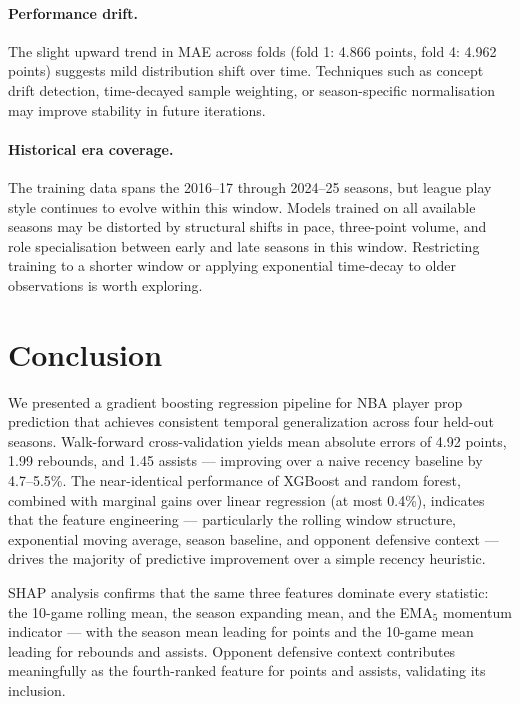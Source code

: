 \documentclass[12pt, letterpaper]{article}
\begin{document}
\paragraph{Performance drift.}
The slight upward trend in MAE across folds (fold 1: 4.866 points,
fold 4: 4.962 points) suggests mild distribution shift over time.
Techniques such as concept drift detection, time-decayed sample
weighting, or season-specific normalisation may improve stability
in future iterations.

\paragraph{Historical era coverage.}
The training data spans the 2016--17 through 2024--25 seasons, but league
play style continues to evolve within this window.
Models trained on all available seasons may be distorted by
structural shifts in pace, three-point volume, and role specialisation
between early and late seasons in this window.
Restricting training to a shorter window or applying
exponential time-decay to older observations is worth exploring.

\section{Conclusion}
\label{sec:conclusion}

We presented a gradient boosting regression pipeline for NBA player prop
prediction that achieves consistent temporal generalization across four
held-out seasons.
Walk-forward cross-validation yields mean absolute errors of 4.92 points,
1.99 rebounds, and 1.45 assists --- improving over a naive recency baseline
by 4.7--5.5\%.
The near-identical performance of XGBoost and random forest, combined with
marginal gains over linear regression (at most 0.4\%), indicates that the
feature engineering --- particularly the rolling window structure,
exponential moving average, season baseline, and opponent defensive
context --- drives the majority of predictive improvement over a simple
recency heuristic.

SHAP analysis confirms that the same three features dominate every
statistic: the 10-game rolling mean, the season expanding mean, and the
EMA$_5$ momentum indicator --- with the season mean leading for points and
the 10-game mean leading for rebounds and assists.
Opponent defensive context contributes meaningfully as the fourth-ranked
feature for points and assists, validating its inclusion.
\end{document}
